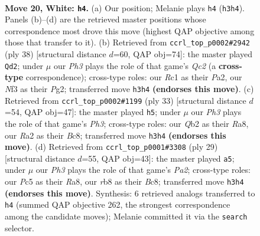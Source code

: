\documentclass[11pt]{article}
\begin{document}
\clearpage

\begin{figure}[p]\centering
\begin{subfigure}{0.46\textwidth}\centering
\resizebox{\linewidth}{!}{%
\newchessgame
\chessboard[
  setfen={1r1r2k1/1p1bqppp/2n1p3/p1Pp4/3P4/P1P2N1P/RQ2BPP1/2R3K1 w - - 6 20},
  showmover=false,
  pgfstyle=straightmove, color=movearrow, markmove={h3-h4}
]}
\caption{}
\end{subfigure}\hfill
\begin{subfigure}{0.46\textwidth}\centering
\resizebox{\linewidth}{!}{%
\newchessgame
\chessboard[
  setfen={2r1r1k1/pp1bqpp1/2p2n1p/3p4/1P1P4/2NBP2P/P1Q2PP1/1R2R1K1 w - - 1 20},
  showmover=false,
  pgfstyle=straightmove, color=movearrow, markmove={c2-d2}
]}
\caption{}
\end{subfigure}
\\[4pt]
\begin{subfigure}{0.46\textwidth}\centering
\resizebox{\linewidth}{!}{%
\newchessgame
\chessboard[
  setfen={r1b1r2k/pp2qpp1/2p2n1p/3p4/1P1P4/2NBP3/P1Q2PPP/RR4K1 b - - 0 17},
  showmover=false,
  pgfstyle=straightmove, color=movearrow, markmove={h6-h5}
]}
\caption{}
\end{subfigure}\hfill
\begin{subfigure}{0.46\textwidth}\centering
\resizebox{\linewidth}{!}{%
\newchessgame
\chessboard[
  setfen={r1b1r1k1/pp1nqpp1/2p4p/4p3/3P4/4PN2/PPQ1BPPP/2R2RK1 b - - 3 15},
  showmover=false,
  pgfstyle=straightmove, color=movearrow, markmove={a7-a5}
]}
\caption{}
\end{subfigure}
\caption{\textbf{Move 20, White: \texttt{h4}.} (a) Our position; Melanie plays \texttt{h4} (\texttt{h3h4}). Panels (b)--(d) are the retrieved master positions whose correspondence most drove this move (highest QAP objective among those that transfer to it). (b) Retrieved from \texttt{ccrl\_top\_p0002\#2942} (ply 38) [structural distance $d$=60, QAP obj=74]: the master played \texttt{Qd2}; under $\mu$ our \emph{Ph3} plays the role of that game's \emph{Qc2} (a \textbf{cross-type} correspondence); cross-type roles: our \emph{R}c1 as their \emph{P}a2, our \emph{N}f3 as their \emph{P}g2; transferred move \texttt{h3h4} \textbf{(endorses this move)}. (c) Retrieved from \texttt{ccrl\_top\_p0002\#1199} (ply 33) [structural distance $d$=54, QAP obj=47]: the master played \texttt{h5}; under $\mu$ our \emph{Ph3} plays the role of that game's \emph{Ph3}; cross-type roles: our \emph{Q}b2 as their \emph{R}a8, our \emph{R}a2 as their \emph{B}c8; transferred move \texttt{h3h4} \textbf{(endorses this move)}. (d) Retrieved from \texttt{ccrl\_top\_p0001\#3308} (ply 29) [structural distance $d$=55, QAP obj=43]: the master played \texttt{a5}; under $\mu$ our \emph{Ph3} plays the role of that game's \emph{Pa2}; cross-type roles: our \emph{P}c5 as their \emph{R}a8, our \emph{r}b8 as their \emph{B}c8; transferred move \texttt{h3h4} \textbf{(endorses this move)}. Synthesis: 6 retrieved analogs transferred to \texttt{h4} (summed QAP objective 262, the strongest correspondence among the candidate moves); Melanie committed it via the \texttt{search} selector.}
\label{fig:thought-m38}
\end{figure}
\end{document}
